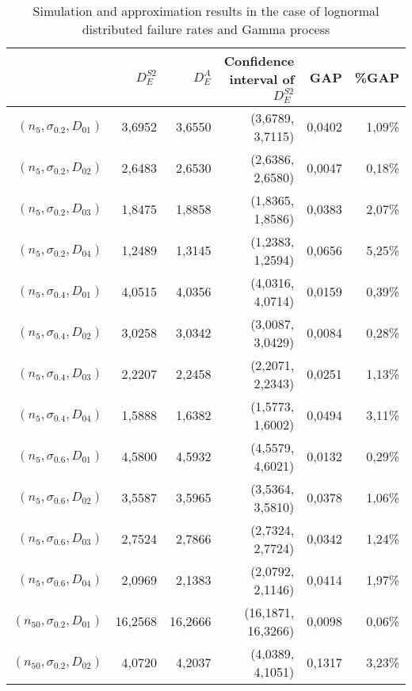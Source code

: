 \documentclass[preprint,12pt]{elsarticle}
\begin{document}
\begin{table}[htbp]
  \centering
  \caption{Simulation and approximation results in the case of lognormal distributed failure rates and Gamma process}
    \begin{tabular}{rrrrrr}
     \toprule
          & $D_{E}^{S2}$ & $D_{E}^{A}$ & Confidence interval of $D_{E}^{S2}$ & GAP & \%GAP \\
    \midrule
$(n_{5},\sigma_{0.2},D_{01})$ & 3,6952 & 3,6550 & (3,6789, 3,7115) & 0,0402 & 1,09\% \\
$(n_{5},\sigma_{0.2},D_{02})$  & 2,6483 & 2,6530 & (2,6386, 2,6580) & 0,0047 & 0,18\% \\
$(n_{5},\sigma_{0.2},D_{03})$  & 1,8475 & 1,8858 & (1,8365, 1,8586) & 0,0383 & 2,07\% \\
$(n_{5},\sigma_{0.2},D_{04})$  & 1,2489 & 1,3145 & (1,2383, 1,2594) & 0,0656 & 5,25\% \\
$(n_{5},\sigma_{0.4},D_{01})$  & 4,0515 & 4,0356 & (4,0316, 4,0714) & 0,0159 & 0,39\% \\
$(n_{5},\sigma_{0.4},D_{02})$  & 3,0258 & 3,0342 & (3,0087, 3,0429) & 0,0084 & 0,28\% \\
$(n_{5},\sigma_{0.4},D_{03})$  & 2,2207 & 2,2458 & (2,2071, 2,2343) & 0,0251 & 1,13\% \\
$(n_{5},\sigma_{0.4},D_{04})$  & 1,5888 & 1,6382 & (1,5773, 1,6002) & 0,0494 & 3,11\% \\
$(n_{5},\sigma_{0.6},D_{01})$ & 4,5800 & 4,5932 & (4,5579, 4,6021) & 0,0132 & 0,29\% \\
$(n_{5},\sigma_{0.6},D_{02})$ & 3,5587 & 3,5965 & (3,5364, 3,5810) & 0,0378 & 1,06\% \\
$(n_{5},\sigma_{0.6},D_{03})$ & 2,7524 & 2,7866 & (2,7324, 2,7724) & 0,0342 & 1,24\% \\
$(n_{5},\sigma_{0.6},D_{04})$ & 2,0969 & 2,1383 & (2,0792, 2,1146) & 0,0414 & 1,97\% \\
$(n_{50},\sigma_{0.2},D_{01})$ & 16,2568 & 16,2666 & (16,1871, 16,3266) & 0,0098 & 0,06\% \\
$(n_{50},\sigma_{0.2},D_{02})$ & 4,0720 & 4,2037 & (4,0389, 4,1051) & 0,1317 & 3,23\% \\

\end{tabular}
\end{table}
\end{document}
